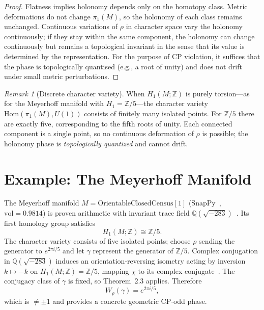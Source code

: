 \documentclass[12pt]{article}
\theoremstyle{definition}
\theoremstyle{remark}
\newtheorem{remark}[theorem]{Remark}
\begin{document}
\begin{proof}
Flatness implies holonomy depends only on the homotopy class.
Metric deformations do not change $\pi_1(M)$, so the holonomy of each class
remains unchanged.  Continuous variations of $\rho$ in character space
vary the holonomy continuously; if they stay within the same component,
the holonomy can change continuously but remains a topological invariant
in the sense that its value is determined by the representation.
For the purpose of CP violation, it suffices that the phase is
topologically quantised (e.g., a root of unity) and does not drift
under small metric perturbations.
\end{proof}

\begin{remark}[Discrete character variety]
When $H_1(M;\mathbb{Z})$ is purely torsion---as for the Meyerhoff
manifold with $H_1=\mathbb{Z}/5$---the character variety
$\mathrm{Hom}(\pi_1(M),U(1))$ consists of finitely many isolated points.
For $\mathbb{Z}/5$ there are exactly five, corresponding to the fifth
roots of unity.  Each connected component is a single point, so no
continuous deformation of $\rho$ is possible; the holonomy phase is
\emph{topologically quantized} and cannot drift.
\end{remark}

\section{Example: The Meyerhoff Manifold}

The Meyerhoff manifold $M=\mathrm{OrientableClosedCensus}[1]$
(SnapPy~\cite{SnapPy}, $\mathrm{vol}=0.9814$) is proven arithmetic
with invariant trace field $\mathbb{Q}(\sqrt{-283})$~\cite{Chinburg98}.
Its first homology group satisfies
\[
H_1(M;\mathbb{Z}) \cong \mathbb{Z}/5.
\]
The character variety consists of five isolated points; choose $\rho$
sending the generator to $e^{2\pi i/5}$ and let $\gamma$ represent the
generator of $\mathbb{Z}/5$.
Complex conjugation in $\mathbb{Q}(\sqrt{-283})$ induces an
orientation-reversing isometry acting by inversion
$k\mapsto -k$ on $H_1(M;\mathbb{Z})=\mathbb{Z}/5$,
mapping $\chi$ to its complex conjugate~\cite{MaclachlanReid,Chinburg98}.
The conjugacy class of $\gamma$ is fixed, so Theorem~2.3 applies.
Therefore
\[
W_\rho(\gamma) = e^{2\pi i/5},
\]
which is $\neq \pm 1$ and provides a concrete geometric CP-odd phase.
\end{document}

